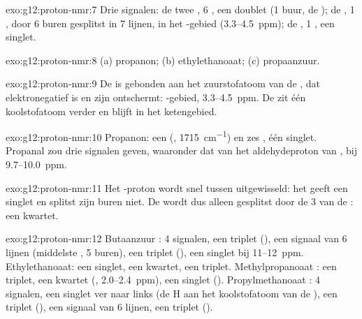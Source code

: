 \begin{solution}{exo:g12:proton-nmr:7}
Drie signalen: de twee , 6 , een doublet (1
buur, de ); de , 1 , door 6 buren gesplitst
in 7 lijnen, in het -gebied (3.3--\qty{4.5}{ppm}); de
, 1 , een singlet.
\end{solution}

\begin{solution}{exo:g12:proton-nmr:8}
(a) propanon; (b) ethylethanoaat; (c) propaanzuur.
\end{solution}

\begin{solution}{exo:g12:proton-nmr:9}
De  is gebonden aan het zuurstofatoom van de , dat
elektronegatief is en zijn  ontschermt: -gebied,
3.3--\qty{4.5}{ppm}. De  zit één koolstofatoom verder en blijft
in het ketengebied.
\end{solution}

\begin{solution}{exo:g12:proton-nmr:10}
Propanon: een  (, \qty{1715}{cm^{-1}}) en zes , één singlet. Propanal zou drie signalen geven, waaronder dat
van het aldehydeproton van , bij 9.7--\qty{10.0}{ppm}.
\end{solution}

\begin{solution}{exo:g12:proton-nmr:11}
Het -proton wordt snel tussen  uitgewisseld: het geeft
een singlet en splitst zijn buren niet. De  wordt dus alleen
gesplitst door de 3  van de : een kwartet.
\end{solution}

\begin{solution}{exo:g12:proton-nmr:12}
Butaanzuur : 4 signalen, een triplet (), een
signaal van 6 lijnen (middelste , 5 buren), een triplet
(), een singlet bij 11--\qty{12}{ppm}. Ethylethanoaat: een
singlet, een kwartet, een triplet. Methylpropanoaat :
een triplet, een kwartet (, 2.0--\qty{2.4}{ppm}), een singlet
(). Propylmethanoaat : 4 signalen, een
singlet ver naar links (de H aan het koolstofatoom van de ), een
triplet (), een signaal van 6 lijnen, een triplet ().
\end{solution}

